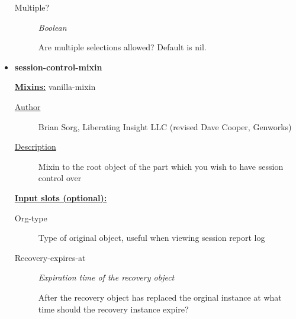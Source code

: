 \documentclass [11pt]{book}
\begin{document}
\begin{itemize}
\begin{description}
\item [Multiple?]
\emph{Boolean}

 Are multiple selections allowed? Default is nil.




\end{description}







\item {}
\label{prim:session-control-mixin}
\textbf{session-control-mixin}


\textbf{
\underline{Mixins:}} vanilla-mixin





\begin{description}

\item [
\underline{Author}]


Brian Sorg, Liberating Insight LLC (revised Dave Cooper, Genworks)



\item [
\underline{Description}]


Mixin to the root object of the part which you wish to have session control over



\end{description}








\textbf{
\underline{Input slots (optional):}}

\begin{description}

\item [Org-type]

Type of original object, useful when viewing session report log




\item [Recovery-expires-at]
\emph{Expiration time of the recovery object}

 After the recovery object has replaced the orginal
instance at what time should the recovery instance expire?





\end{description}
\end{itemize}
\end{document}
